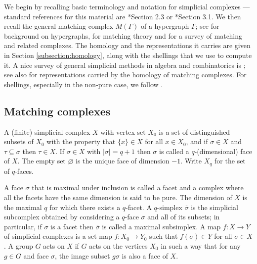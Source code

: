 \documentclass[matann2]{svjour1}
\def\ss{\sigma}
\def\tt{\tau}
\def\ra{\rightarrow}
\begin{document}
We begin by recalling basic terminology 
and notation for simplicial complexes --- standard references for this 
material are \cite{MR1402473}*{Section 2.3} or 
\cite{MR0210112}*{Section 3.1}.
We then recall the general matching complex $M(\Gamma)$ of a
hypergraph $\Gamma$;
see 
\cite{MR1013569} for background on hypergraphs,
\cite{MR2536865} for matching theory and 
\cite{MR2368284} for a survey of matching and related complexes.
The homology and the representations it carries are given in
Section \ref{subsection:homology}, along with the shellings that we
use to compute it. 
A nice survey of general simplicial methods in
algebra and combinatorics is \cite{Wachs07}; see also \cite{MR2022345}
for representations carried by the homology of matching complexes. 
For shellings, especially in the non-pure case, we follow
\cite{MR1333388}. 

\subsection{Matching complexes}
\label{subsection:matching}

A (finite) simplicial complex $X$ with vertex set $X_0$ is 
a set of distinguished subsets of $X_0$ with the property 
that $\{x\}\in X$ for all $x\in X_0$, and
if $\ss\in X$ and $\tt\subseteq\ss$ then $\tt\in X$. 
If $\ss\in X$ with $|\ss|=q+1$ then 
$\ss$ is called a $q$-(dimensional) face of $X$. 
The empty set
$\varnothing$ is the unique face of dimension $-1$. 
Write $X_q$ for the set of $q$-faces.

A face $\ss$ that is maximal under inclusion is called a 
facet
and a complex where all the facets have the same dimension
is said to be pure. The dimension of $X$ is the maximal $q$
for which there exists a $q$-facet.
A $q$-simplex
$\overline{\ss}$ is the
simplicial subcomplex obtained by considering a $q$-face $\ss$ and
all of its subsets; in particular, if $\ss$ is a 
facet then $\overline{\ss}$ is called
a maximal subsimplex. A map
$f:X\ra Y$ of simplicial complexes is a set map $f:X_0\ra Y_0$ such that
$f(\ss)\in Y$ for all $\ss\in X$. A group $G$ acts on $X$ if $G$ acts on the 
vertices $X_0$ in such a way that for any $g\in G$ and face $\ss$, the image subset 
$g\ss$ is also a face of $X$.
\end{document}

